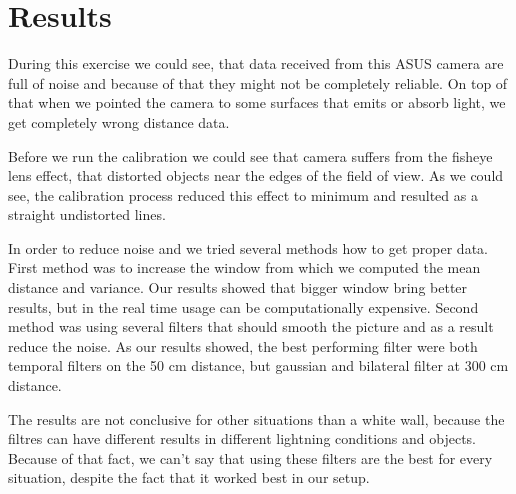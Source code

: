 \documentclass[11pt]{article}
\begin{document}
\section{Results}
During this exercise we could see, that data received from this ASUS camera are 
full of noise and because of that they might not be completely reliable. On top of 
that when we pointed the camera to some surfaces that emits or absorb light, we 
get completely wrong distance data. \par
Before we run the calibration we could see that camera suffers from the fisheye lens 
effect, that distorted objects near the edges of the field of view. As we could see, 
the calibration process reduced this effect to minimum and resulted as a straight 
undistorted lines. \par
In order to reduce noise and we tried several methods how to get proper data. 
First method was to increase the window from which we computed the mean distance and 
variance. Our results showed that bigger window bring better results, but in the 
real time usage can be computationally expensive. Second method was using several filters 
that should smooth the picture and as a result reduce the noise. As our results showed, 
the best performing filter were both temporal filters on the 50 cm distance, but gaussian 
and bilateral filter at 300 cm distance. \par 
The results are not conclusive for other situations than a white wall, because the 
filtres can have different results in different lightning conditions and objects. Because 
of that fact, we can't say that using these filters are the best for every situation, despite 
the fact that it worked best in our setup. \par


\end{document}
